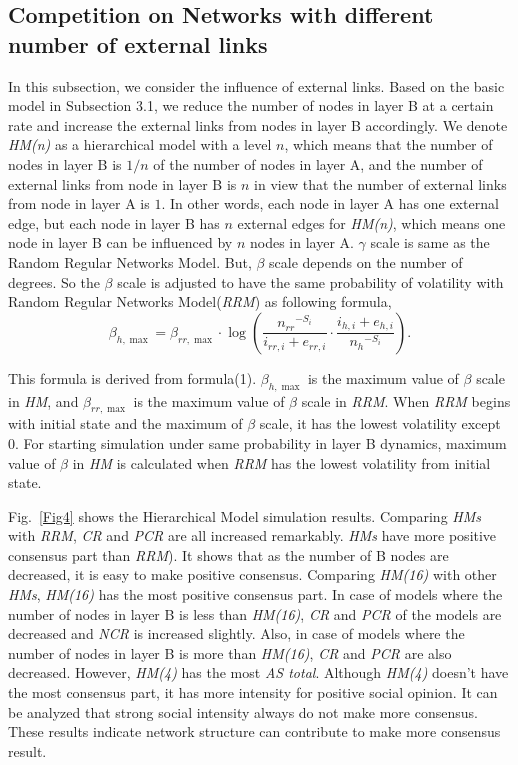 \documentclass[english]{cccconf}
\begin{document}
\subsection{Competition on Networks with different number of external links}

In this subsection, we consider the influence of external links. Based on the basic model in Subsection 3.1, we reduce the number of nodes in layer B at a certain rate and increase the external links from nodes in layer B accordingly.  We denote \textit{HM(n)} as a hierarchical model with a level $n$, which means that the number of nodes in layer B is $1/n$ of the number of nodes in layer A, and the number of external links from node in layer B is $n$ in view that the number of external links from node in layer A is $1$. In other words, each node in layer A has one external edge, but each node in layer B has $n$ external edges for \textit{HM(n)}, which means one node in layer B can be influenced by $n$ nodes in layer A. $\gamma$ scale is same as the Random Regular Networks Model. But, $\beta$ scale depends on the number of degrees. So the $\beta$ scale is adjusted to have the same probability of volatility with Random Regular Networks Model(\textit{RRM}) as following formula,
\begin{equation}
{\beta _{h,\max}} = {\beta _{rr,\max}} \cdot \log \left( {\frac{{{n_{rr}}^{ - {S_i}}}}{{{i_{rr,i}} + {e_{rr,i}}}} \cdot \frac{{{i_{h,i}} + {e_{h,i}}}}{{{n_{h}}^{ - {S_i}}}}} \right). 
\end{equation}

This formula is derived from formula(1). $\beta _{h,\max}$ is the maximum value of $\beta$ scale in \textit{HM}, and $\beta _{rr,\max}$ is the maximum value of $\beta$ scale in \textit{RRM}. When \textit{RRM} begins with initial state and the maximum of $\beta$ scale, it has the lowest volatility except $0$. For starting simulation under same probability in layer B dynamics, maximum value of $\beta$ in \textit{HM} is calculated when \textit{RRM} has the lowest volatility from initial state. 

Fig.~\ref{Fig4} shows the Hierarchical Model simulation results. Comparing \textit{HMs} with \textit{RRM}, \textit{CR} and \textit{PCR} are all increased remarkably. \textit{HMs} have more positive consensus part than \textit{RRM}). It shows that as the number of B nodes are decreased, it is easy to make positive consensus. Comparing \textit{HM(16)} with other \textit{HMs}, \textit{HM(16)} has the most positive consensus part. In case of models where the number of nodes in layer B is less than \textit{HM(16)},  \textit{CR} and \textit{PCR} of the models are decreased and \textit{NCR} is increased slightly. Also, in case of models where the number of nodes in layer B is more than \textit{HM(16)}, \textit{CR} and \textit{PCR} are also decreased. However, \textit{HM(4)} has the most \textit{AS total}. Although \textit{HM(4)} doesn't have the most consensus part, it has more intensity for positive social opinion. It can be analyzed that strong social intensity always do not make more consensus. These results indicate network structure can contribute to make more consensus result. 
   
\end{document}
